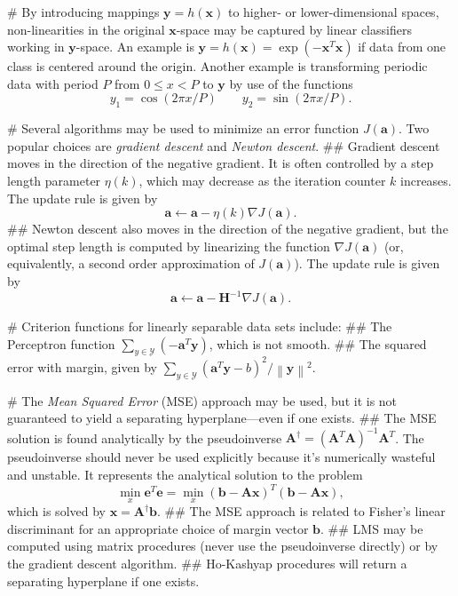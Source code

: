 \documentclass[12pt, a4paper]{article}
\newcommand{\Y}{\mathcal{Y}}
\newcommand{\vect}[1]{\bm{#1}}
\newcommand{\norm}[1]{\left\lVert#1\right\rVert}
\begin{document}
\begin{easylist}[itemize]
# By introducing mappings $\vect{y} = h(\vect{x})$ to higher- or lower-dimensional spaces, non-linearities in the original $\vect{x}$-space may be captured by linear classifiers working in $\vect{y}$-space. 
An example is $\vect{y} = h(\vect{x}) = \exp(-\vect{x}^T \vect{x})$ if data from one class is centered around the origin.
Another example is transforming periodic data with period $P$ from $0 \leq x < P$ to $\vect{y}$ by use of the functions
\begin{equation*}
	y_1 = \cos \left( 2 \pi x / P \right)
	\qquad 
	y_2 = \sin \left( 2 \pi x / P \right).
\end{equation*}

# Several algorithms may be used to minimize an error function $J(\vect{a})$.
Two popular choices are \emph{gradient descent} and \emph{Newton descent}.
## Gradient descent moves in the direction of the negative gradient.
It is often controlled by a step length parameter $\eta(k)$, which may decrease as the iteration counter $k$ increases.
The update rule is given by
\begin{equation*}
	\vect{a} \leftarrow \vect{a} - \eta(k) \nabla J(\vect{a}).
\end{equation*}
## Newton descent also moves in the direction of the negative gradient, but the optimal step length is computed by linearizing the function $\nabla J(\vect{a})$ (or, equivalently, a second order approximation of $J(\vect{a})$).
The update rule is given by
\begin{equation*}
\vect{a} \leftarrow \vect{a} - \vect{H}^{-1} \nabla J(\vect{a}).
\end{equation*}

# Criterion functions for linearly separable data sets include:
## The Perceptron function $\sum_{y \in \Y} (-\vect{a}^T \vect{y})$, which is not smooth.
## The squared error with margin, given by $\sum_{y \in \Y} (\vect{a}^T \vect{y} - b)^2 / \norm{\vect{y}}^2$.

# The \emph{Mean Squared Error} (MSE) approach may be used, but it is not guaranteed to yield a separating hyperplane---even if one exists.
## The MSE solution is found analytically by the pseudoinverse $\vect{A}^\dagger = \left( \vect{A}^T \vect{A} \right)^{-1} \vect{A}^T$. 
The pseudoinverse should never be used explicitly because it's numerically wasteful and unstable.
It represents the analytical solution to the problem
\begin{equation*}
	\min_x \vect{e}^T\vect{e} = 
	\min_x \left(\vect{b} - \vect{A}\vect{x}\right)^T
	\left(\vect{b} - \vect{A}\vect{x}\right),
\end{equation*}
which is solved by $\vect{x} = \vect{A}^\dagger \vect{b}$.
## The MSE approach is related to Fisher's linear discriminant for an appropriate choice of margin vector $\vect{b}$.
## LMS may be computed using matrix procedures (never use the pseudoinverse directly) or by the gradient descent algorithm.
## Ho-Kashyap procedures will return a separating hyperplane if one exists.


\end{easylist}
\end{document}
